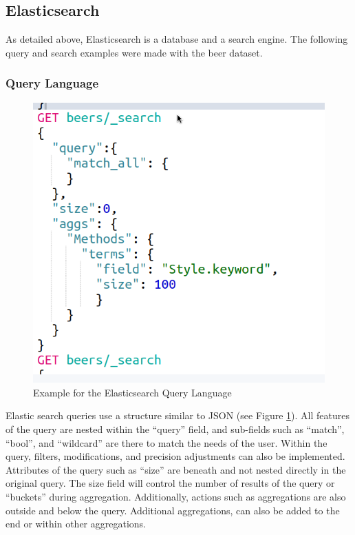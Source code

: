 \documentclass[bibliography=totoc]{article}
\begin{document}
\subsection{Elasticsearch}
As detailed above, Elasticsearch is a database and a search engine.
The following query and search examples were made with the beer dataset.

\subsubsection{Query Language}
\begin{figure}
   \includegraphics[height=0.7\textwidth]{beer_query_language.png}
   \caption{\label{beer_query_language}Example for the Elasticsearch Query Language} 
\end{figure}
Elastic search queries use a structure similar to JSON (see Figure \ref{beer_query_language}).
All features of the query are nested within the “query” field, 
and sub-fields such as “match”, “bool”, and “wildcard” are 
there to match the needs of the user. 
Within the query, filters, modifications, and precision adjustments 
can also be implemented.
Attributes of the query such as “size” are beneath and not nested 
directly in the original query. The size field will control the 
number of results of the query or “buckets” during aggregation. 
Additionally, actions such as aggregations are also outside and below 
the query. Additional aggregations, can also be added to the end 
or within other aggregations.
\end{document}
